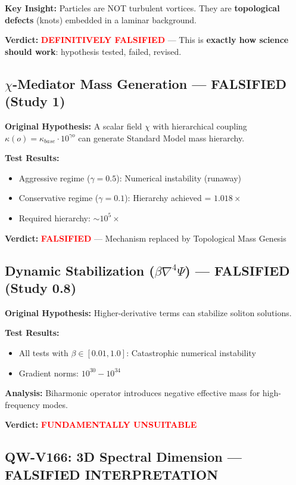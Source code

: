 \documentclass[11pt,a4paper]{book}
\theoremstyle{remark}
\begin{document}
\textbf{Key Insight:} Particles are NOT turbulent vortices. They are \textbf{topological defects} (knots) embedded in a laminar background.

\textbf{Verdict:} \textcolor{red}{\textbf{DEFINITIVELY FALSIFIED}} --- This is \textbf{exactly how science should work}: hypothesis tested, failed, revised.

\subsection{\texorpdfstring{$\chi$}{Chi}-Mediator Mass Generation --- FALSIFIED (Study 1)}

\textbf{Original Hypothesis:} A scalar field $\chi$ with hierarchical coupling $\kappa(o) = \kappa_{base} \cdot 10^{\gamma o}$ can generate Standard Model mass hierarchy.

\textbf{Test Results:}
\begin{itemize}
    \item Aggressive regime ($\gamma = 0.5$): Numerical instability (runaway)
    \item Conservative regime ($\gamma = 0.1$): Hierarchy achieved = $1.018\times$
    \item Required hierarchy: $\sim 10^5 \times$
\end{itemize}

\textbf{Verdict:} \textcolor{red}{\textbf{FALSIFIED}} --- Mechanism replaced by Topological Mass Genesis

\subsection{Dynamic Stabilization ($\beta\nabla^4\Psi$) --- FALSIFIED (Study 0.8)}

\textbf{Original Hypothesis:} Higher-derivative terms can stabilize soliton solutions.

\textbf{Test Results:}
\begin{itemize}
    \item All tests with $\beta \in [0.01, 1.0]$: Catastrophic numerical instability
    \item Gradient norms: $10^{30} - 10^{34}$
\end{itemize}

\textbf{Analysis:} Biharmonic operator introduces negative effective mass for high-frequency modes.

\textbf{Verdict:} \textcolor{red}{\textbf{FUNDAMENTALLY UNSUITABLE}}

\subsection{QW-V166: 3D Spectral Dimension --- FALSIFIED INTERPRETATION}
\end{document}
